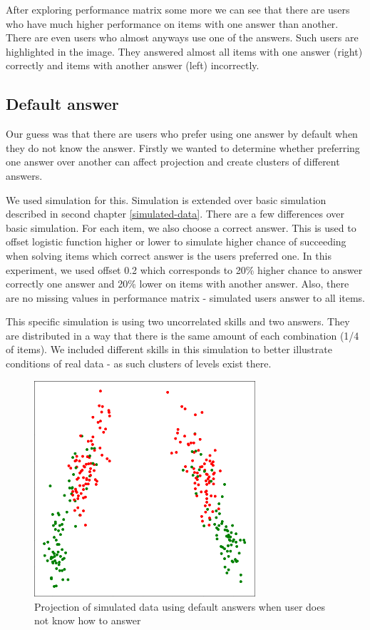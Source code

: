 \documentclass[
  digital, %
  table,   %
  nolof,     %
  nolot,     %
  nocover,
  color
]{fithesis3}
\begin{document}
After exploring performance matrix some more we can see that there are users who have much higher performance on items with one answer than another. There are even users who almost anyways use one of the answers. Such users are highlighted in the image. They answered almost all items with one answer (right) correctly and items with another answer (left) incorrectly.


\subsection{Default answer}\label{default-answer}

Our guess was that there are users who prefer using one answer by default when they do not know the answer. Firstly we wanted to determine whether preferring one answer over another can affect projection and create clusters of different answers.

We used simulation for this. Simulation is extended over basic simulation described in second chapter \ref{simulated-data}. There are a few differences over basic simulation. For each item, we also choose a correct answer. This is used to offset logistic function higher or lower to simulate higher chance of succeeding when solving items which correct answer is the users preferred one. In this experiment, we used offset 0.2 which corresponds to 20\% higher chance to answer correctly one answer and 20\% lower on items with another answer. Also, there are no missing values in performance matrix - simulated users answer to all items.

This specific simulation is using two uncorrelated skills and two answers. They are distributed in a way that there is the same amount of each combination (1/4 of items). We included different skills in this simulation to better illustrate conditions of real data - as such clusters of levels exist there.

\begin{figure}
  \includegraphics[height=8cm]{img/simulated_default}
  \caption{Projection of simulated data using default answers when user does not know how to answer}
  \label{fig:simulated_default}
\end{figure}
\end{document}
